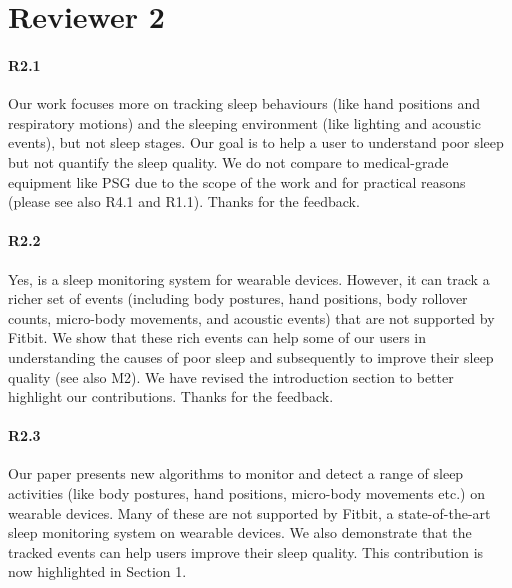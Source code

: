\section*{Reviewer 2}
\paragraph{R2.1} Our work focuses more on tracking sleep behaviours (like hand positions and respiratory motions) and the sleeping environment (like lighting and acoustic events), but not sleep stages. Our goal is to help a user to understand poor sleep but not quantify the sleep quality. We do not compare to medical-grade equipment like PSG due to the scope of the work and for practical reasons (please see also R4.1 and R1.1). Thanks for the feedback.


\paragraph{R2.2} Yes, \systemname is a sleep monitoring system for wearable devices. However, it can track a richer set of events
(including body postures, hand positions, body rollover counts, micro-body movements, and acoustic events) that are not supported by
Fitbit. We show that these rich events can help some of our users in understanding the causes of poor sleep and subsequently to improve
their sleep quality (see also M2). We have revised the introduction section to better highlight our contributions. Thanks for the feedback.

\paragraph{R2.3} Our paper presents new algorithms to monitor and detect a range of sleep activities (like body postures, hand positions,
micro-body movements etc.) on wearable devices. Many of these are not supported by Fitbit, a state-of-the-art sleep monitoring system on
wearable devices. We also demonstrate that the tracked events can help users improve their sleep quality. This contribution is now
highlighted in Section 1.
